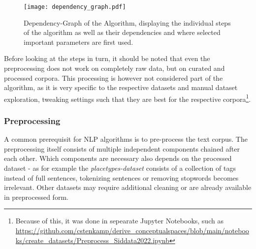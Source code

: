 \begin{figure}[htp]
	\begin{center}
	  \texttt{[image: dependency\_graph.pdf]}
	  \caption[Dependency-Graph of the Algorithm]{Dependency-Graph of the Algorithm, displaying the individual steps of the algorithm as well as their dependencies and where selected important parameters are first used. }
	  \label{fig:dependency_graph}
	\end{center}
\end{figure}




Before looking at the steps in turn, it should be noted that even the preprocessing does not work on completely raw data, but on curated and processed corpora. This processing is however not considered part of the algorithm, as it is very specific to the respective datasets and manual dataset exploration, tweaking settings such that they are best for the respective corpora\footnote{Because of this, it was done in sepearate Jupyter Notebooks, such as \url{https://github.com/cstenkamp/derive_conceptualspaces/blob/main/notebooks/create_datasets/Preprocess_Siddata2022.ipynb} }. %


\subsubsection{Preprocessing}

\label{sec:algo_preproc}

A common prerequisit for NLP algorithms is to pre-process the text corpus. The preprocessing itself consists of multiple independent components chained after each other. Which components are necessary also depends on the processed dataset - as for example the \emph{placetypes-dataset} consists of a collection of tags instead of full sentences, tokenizing sentences or removing \glspl{stopword} becomes irrelevant. Other datasets may require additional cleaning or are already available in preprocessed form.

